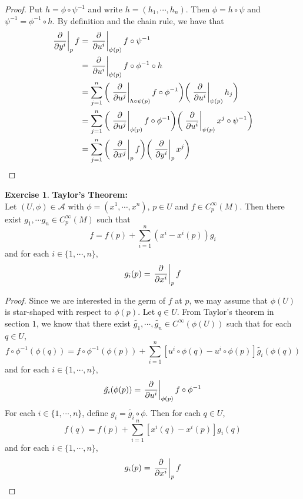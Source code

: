 \documentclass[12pt]{amsart}
\theoremstyle{definition}
\newtheorem{ex}[definition]{Exercise}
\newcommand{\MA}{\mathcal{A}}
\begin{document}
	\begin{proof}
		Put $h = \phi \circ \psi^{-1}$ and write $h = (h_1, \cdots, h_n)$. Then $\phi = h \circ \psi$ and $\psi^{-1} = \phi^{-1} \circ h$. By definition and the chain rule, we have that 
		\begin{align*}
		\eval{\pdv{y^i}}_{p} f 
			&= \eval{\pdv{u^i}}_{\psi(p)} f \circ \psi^{-1} \\
			&= \eval{\pdv{u^i}}_{\psi(p)} f \circ \phi^{-1} \circ h \\
			&= \sum_{j=1}^n \bigg( \eval{\pdv{u^j}}_{h \circ \psi (p)} f \circ \phi^{-1} \bigg)  \bigg( \eval{\pdv{u^i}}_{\psi(p)} h_j \bigg) \\
			&= \sum_{j=1}^n \bigg( \eval{\pdv{u^j}}_{\phi (p)} f \circ \phi^{-1}  \bigg) \bigg( \eval{\pdv{u^i}}_{\psi(p)} x^j \circ \psi^{-1} \bigg) \\
			&= \sum_{j=1}^n \bigg( \eval{\pdv{x^j}}_{p} f \bigg)  \bigg(   \eval{\pdv{y^i}}_{p} x^j  \bigg)\\
		\end{align*}
	\end{proof}

	\begin{ex}\textbf{Taylor's Theorem:}\\
		Let $(U, \phi) \in \MA$ with $\phi = (x^1, \cdots, x^n)$, $p \in U$ and $f \in C^{\infty}_p(M)$. Then there exist $g_1, \cdots g_n \in C_p^{\infty}(M)$ such that $$f = f(p) + \sum_{i=1}^n(x^i - x^i(p)) g_i$$ and for each $i \in \{1, \cdots, n\}$, $$g_i(p) = \eval{\pdv{x^i}}_{p} f $$ 
	\end{ex}

	\begin{proof}
		Since we are interested in the germ of $f$ at $p$, we may assume that $\phi(U)$ is star-shaped with respect to $\phi(p)$. Let $q \in U$. From Taylor's theorem in section $1$, we know that there exist $\tilde{g_1}, \cdots, \tilde{g_n} \in C^{\infty}(\phi(U))$ such that for each $q \in U$, $$f \circ \phi^{-1} (\phi(q)) = f \circ \phi^{-1} (\phi(p)) + \sum_{i = 1}^n [u^i \circ \phi(q) - u^i \circ \phi(p)] \tilde{g_i} (\phi(q))$$ and for each $i \in \{1, \cdots, n\}$, $$\tilde{g_i}(\phi(p)) = \eval{\pdv{u^i}}_{\phi(p)} f \circ \phi^{-1}$$ 
		For each $i \in \{1, \cdots, n\}$, define $g_i = \tilde{g_i} \circ \phi$. Then for each $q \in U$, $$ f (q) = f (p) + \sum_{i = 1}^n [x^i(q) - x^i(p)] g_i(q)$$ and for each $i \in \{1, \cdots, n\}$, $$g_i(p) = \eval{\pdv{x^i}}_{p} f $$ 
	\end{proof}
\end{document}
